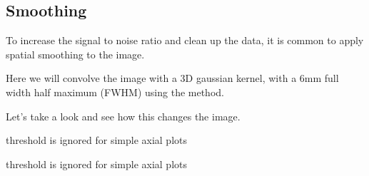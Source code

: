 \documentclass[letterpaper,10pt,english]{sphinxmanual}
\begin{document}
\noindent{}


\subsection{Smoothing}
\label{\detokenize{content/GLM_Single_Subject_Model:smoothing}}
To increase the signal to noise ratio and clean up the data, it is common to apply spatial smoothing to the image.

Here we will convolve the image with a 3\sphinxhyphen{}D gaussian kernel, with a 6mm full width half maximum (FWHM) using the  method.

\begin{sphinxVerbatim}[commandchars=\\\{\}]
  
\end{sphinxVerbatim}

Let’s take a look and see how this changes the image.

\begin{sphinxVerbatim}[commandchars=\\\{\}]
\end{sphinxVerbatim}

\begin{sphinxVerbatim}[commandchars=\\\{\}]
threshold is ignored for simple axial plots
\end{sphinxVerbatim}

\noindent{}

\begin{sphinxVerbatim}[commandchars=\\\{\}]
\end{sphinxVerbatim}

\begin{sphinxVerbatim}[commandchars=\\\{\}]
threshold is ignored for simple axial plots
\end{sphinxVerbatim}

\noindent{}
\end{document}
